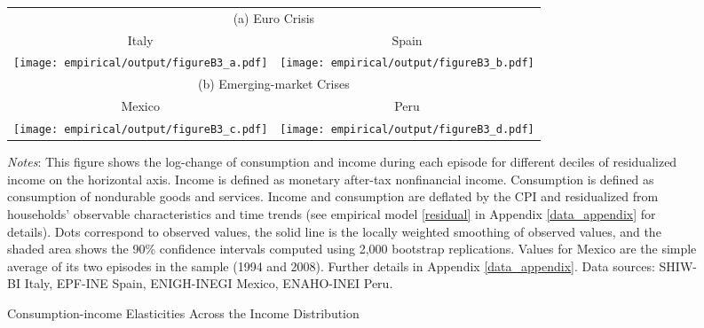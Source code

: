 \documentclass[12pt]{article}
\begin{document}
\begin{spacing}{1.5}
\begin{figure}[H]
\begin{tabular}{cc}
\multicolumn{2}{c}{(a) Euro Crisis} \vspace{.4em}  \\
{\small{}{Italy} } & {\small{}{Spain} } \tabularnewline
\texttt{[image: empirical/output/figureB3\_a.pdf]} &
\texttt{[image: empirical/output/figureB3\_b.pdf]}  \\
\multicolumn{2}{c}{(b) Emerging-market Crises} \vspace{.4em} \\
{\small{}{Mexico} } & {\small{}{Peru} }\tabularnewline
\texttt{[image: empirical/output/figureB3\_c.pdf]} &
\texttt{[image: empirical/output/figureB3\_d.pdf]}  \\
\end{tabular}\caption{Consumption-income Elasticities Across the Income Distribution
\label{fig_CY_incomedecile_residualized}}
\medskip{}
\raggedright{}\textit{\footnotesize{}Notes}{\footnotesize{}: This figure shows the log-change of consumption and income during each episode for different deciles of residualized income on the horizontal axis. Income is defined as monetary after-tax nonfinancial income. Consumption is defined as consumption of nondurable goods and services. Income and consumption are deflated by the CPI and residualized from households' observable characteristics and time trends (see empirical model \eqref{residual} in Appendix \ref{data_appendix} for details). Dots correspond to observed values, the
solid line is the locally weighted smoothing of observed values, and the shaded area shows the 90\% confidence intervals computed using 2,000 bootstrap replications.  Values for Mexico are the simple average of its two episodes in the sample (1994 and 2008).  Further details in Appendix \ref{data_appendix}. Data sources: SHIW-BI Italy, EPF-INE Spain, ENIGH-INEGI Mexico, ENAHO-INEI Peru.}{\footnotesize\par}
\end{figure}




\end{spacing}
\end{document}
